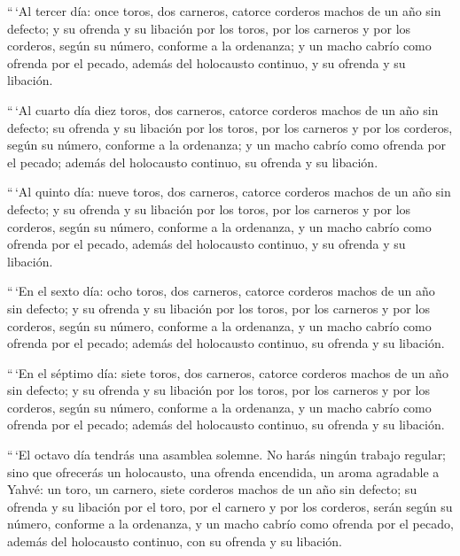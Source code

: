 \begin{paracol}{2}
 ``\,`Al tercer día: once toros, dos carneros, catorce
corderos machos de un año sin defecto;  y su ofrenda y su
libación por los toros, por los carneros y por los corderos, según su
número, conforme a la ordenanza;  y un macho cabrío como
ofrenda por el pecado, además del holocausto continuo, y su ofrenda y su
libación.

 ``\,`Al cuarto día diez toros, dos carneros, catorce
corderos machos de un año sin defecto;  su ofrenda y su
libación por los toros, por los carneros y por los corderos, según su
número, conforme a la ordenanza;  y un macho cabrío como
ofrenda por el pecado; además del holocausto continuo, su ofrenda y su
libación.

 ``\,`Al quinto día: nueve toros, dos carneros, catorce
corderos machos de un año sin defecto;  y su ofrenda y su
libación por los toros, por los carneros y por los corderos, según su
número, conforme a la ordenanza,  y un macho cabrío como
ofrenda por el pecado, además del holocausto continuo, y su ofrenda y su
libación.

 ``\,`En el sexto día: ocho toros, dos carneros, catorce
corderos machos de un año sin defecto;  y su ofrenda y su
libación por los toros, por los carneros y por los corderos, según su
número, conforme a la ordenanza,  y un macho cabrío como
ofrenda por el pecado; además del holocausto continuo, su ofrenda y su
libación.

 ``\,`En el séptimo día: siete toros, dos carneros,
catorce corderos machos de un año sin defecto;  y su
ofrenda y su libación por los toros, por los carneros y por los
corderos, según su número, conforme a la ordenanza,  y un
macho cabrío como ofrenda por el pecado; además del holocausto continuo,
su ofrenda y su libación.

 ``\,`El octavo día tendrás una asamblea solemne. No
harás ningún trabajo regular;  sino que ofrecerás un
holocausto, una ofrenda encendida, un aroma agradable a Yahvé: un toro,
un carnero, siete corderos machos de un año sin defecto; 
su ofrenda y su libación por el toro, por el carnero y por los corderos,
serán según su número, conforme a la ordenanza,  y un
macho cabrío como ofrenda por el pecado, además del holocausto continuo,
con su ofrenda y su libación.


\end{paracol}
